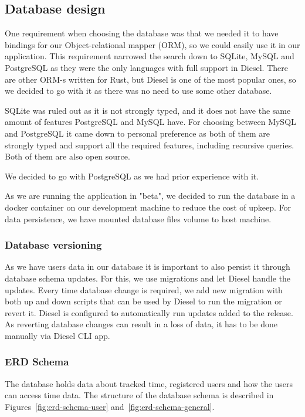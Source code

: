\subsection{Database design}\label{subsec:database-design}
One requirement when choosing the database was that we needed it to have bindings for our Object-relational mapper (ORM),
so we could easily use it in our application.
This requirement narrowed the search down to SQLite, MySQL and PostgreSQL as they were the only languages with full support in Diesel.
There are other ORM-s written for Rust, but Diesel is one of the most popular ones, so we decided to go with it as
there was no need to use some other database.

SQLite was ruled out as it is not strongly typed, and it does not have the same amount of features PostgreSQL and MySQL have.
For choosing between MySQL and PostgreSQL it came down to personal preference as both of them are strongly typed and
support all the required features, including recursive queries.
Both of them are also open source.

We decided to go with PostgreSQL as we had prior experience with it.

As we are running the application in "beta", we decided to run the database in a docker container on our development machine to
reduce the cost of upkeep.
For data persistence, we have mounted database files volume to host machine.

\subsubsection{Database versioning}\label{subsubsec:database-versioning}
As we have users data in our database it is important to also persist it through database schema updates.
For this, we use migrations and let Diesel handle the updates.
Every time database change is required, we add new migration with both up and down scripts that can be used by Diesel
to run the migration or revert it.
Diesel is configured to automatically run updates added to the release.
As reverting database changes can result in a loss of data, it has to be done manually via Diesel CLI app.

\subsubsection{ERD Schema}\label{subsubsec:erd-schema}
The database holds data about tracked time, registered users and how the users can access time data.
The structure of the database schema is described in Figures~\ref{fig:erd-schema-user} and~\ref{fig:erd-schema-general}.

